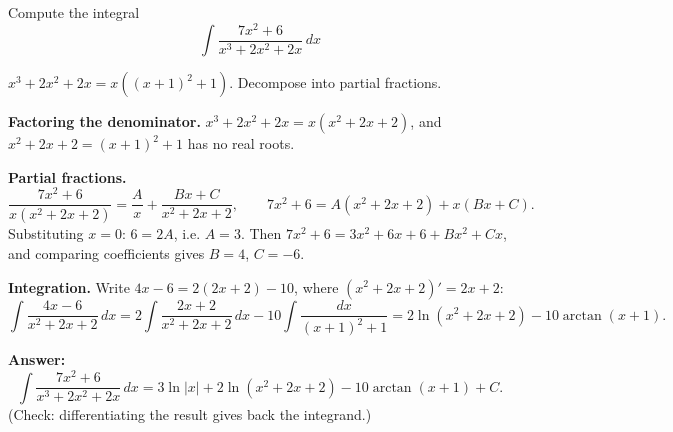 
\begin{question}
Compute the integral
\[ \int\frac{7x^2 + 6}{x^3 + 2x^2 + 2x}\,dx \]
\end{question}

\begin{hint}
$x^3 + 2x^2 + 2x = x\left((x+1)^2 + 1\right)$. Decompose into partial fractions.
\end{hint}

\begin{solution}
\textbf{Factoring the denominator.} $x^3 + 2x^2 + 2x = x(x^2 + 2x + 2)$, and $x^2 + 2x + 2 = (x+1)^2 + 1$ has no real roots.

\textbf{Partial fractions.}
\[ \frac{7x^2 + 6}{x(x^2 + 2x + 2)} = \frac{A}{x} + \frac{Bx + C}{x^2 + 2x + 2}, \qquad 7x^2 + 6 = A(x^2 + 2x + 2) + x(Bx + C). \]
Substituting $x = 0$: $6 = 2A$, i.e. $A = 3$. Then $7x^2 + 6 = 3x^2 + 6x + 6 + Bx^2 + Cx$, and comparing coefficients gives $B = 4$, $C = -6$.

\textbf{Integration.} Write $4x - 6 = 2(2x + 2) - 10$, where $(x^2 + 2x + 2)' = 2x + 2$:
\[ \int\frac{4x - 6}{x^2 + 2x + 2}\,dx = 2\int\frac{2x+2}{x^2+2x+2}\,dx - 10\int\frac{dx}{(x+1)^2 + 1} = 2\ln(x^2 + 2x + 2) - 10\arctan(x + 1). \]

\textbf{Answer:}
\[ \int\frac{7x^2 + 6}{x^3 + 2x^2 + 2x}\,dx = 3\ln|x| + 2\ln(x^2 + 2x + 2) - 10\arctan(x+1) + C. \]
(Check: differentiating the result gives back the integrand.)
\end{solution}
